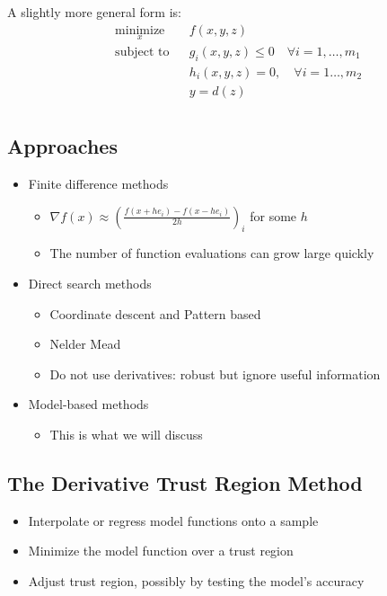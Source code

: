 \documentclass{article} %
\begin{document}
A slightly more general form is:
\begin{equation*}
\begin{aligned}
& \underset{x}{\text{minimize}} & & f(x, y, z) \\
& \text{subject to} & & g_i(x, y, z) \leq 0 \quad \forall i = 1, \ldots, m_1 \\
& & & h_i(x, y, z) = 0, \quad \forall i = 1 \ldots, m_2 \\
& & & y = d(z) \;  \\
\end{aligned}
\end{equation*}



\subsection{Approaches}

\begin{itemize}
\item Finite difference methods
	\begin{itemize}
	\item $\nabla f(x) \approx (\frac{f(x+he_i) - f(x-he_i)}{2h})_i$ for some $h$
	\item The number of function evaluations can grow large quickly
	\end{itemize}
\item Direct search methods
	\begin{itemize}
	\item Coordinate descent and Pattern based
	\item Nelder Mead
	\item Do not use derivatives: robust but ignore useful information
	\end{itemize}
\item Model-based methods
	\begin{itemize}
	\item This is what we will discuss
	\end{itemize}
\end{itemize}


\subsection{The Derivative Trust Region Method}

\begin{itemize}
	\item Interpolate or regress model functions onto a sample
	\item Minimize the model function over a trust region
	\item Adjust trust region, possibly by testing the model's accuracy
\end{itemize}
\end{document}
